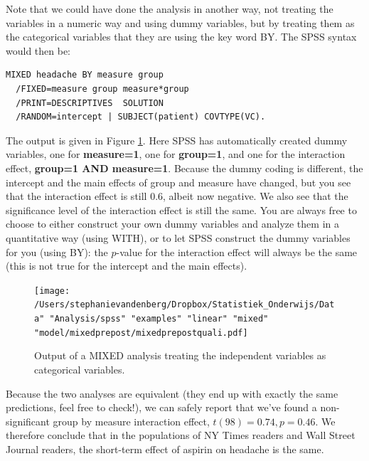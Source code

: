 \documentclass[]{book}\usepackage[]{graphicx}\usepackage[]{color}
\begin{document}
Note that we could have done the analysis in another way, not treating the variables in a numeric way and using dummy variables, but by treating them as the categorical variables that they are using the key word BY. The SPSS syntax would then be:

\begin{verbatim}
MIXED headache BY measure group 
  /FIXED=measure group measure*group
  /PRINT=DESCRIPTIVES  SOLUTION
  /RANDOM=intercept | SUBJECT(patient) COVTYPE(VC).
\end{verbatim}


The output is given in Figure \ref{fig:mixedprepostquali}. Here SPSS has automatically created dummy variables, one for \textbf{measure=1}, one for \textbf{group=1}, and one for the interaction effect, \textbf{group=1 AND measure=1}. Because the dummy coding is different, the intercept and the main effects of group and measure have changed, but you see that the interaction effect is still 0.6, albeit now negative. We also see that the significance level of the interaction effect is still the same. You are always free to choose to either construct your own dummy variables and analyze them in a quantitative way (using WITH), or to let SPSS construct the dummy variables for you (using BY): the $p$-value for the interaction effect will always be the same (this is not true for the intercept and the main effects).



\begin{figure}[h]
    \begin{center}
       \texttt{[image: /Users/stephanievandenberg/Dropbox/Statistiek\_Onderwijs/Data" "Analysis/spss" "examples" "linear" "mixed" "model/mixedprepost/mixedprepostquali.pdf]}
    \end{center}
    \label{fig:mixedprepostquali}
    \caption{Output of a MIXED analysis treating the independent variables as categorical variables.}
\end{figure}



Because the two analyses are equivalent (they end up with exactly the same predictions, feel free to check!), we can safely report that we've found a non-significant group by measure interaction effect, $t(98)=0.74, p=0.46$. We therefore conclude that in the populations of NY Times readers and Wall Street Journal readers, the short-term effect of aspirin on headache is the same. 
\end{document}
